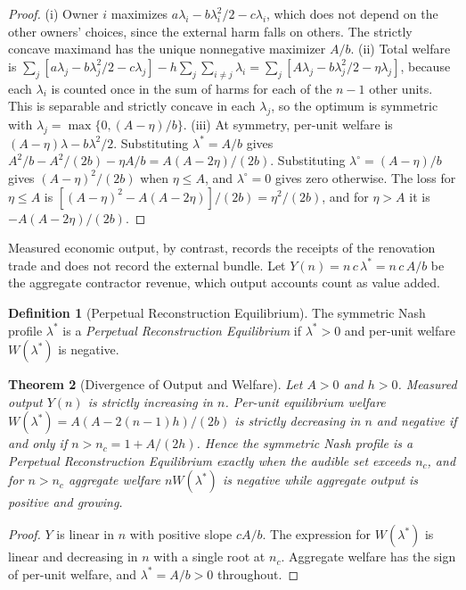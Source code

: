 \documentclass[11pt]{article}
\newtheorem{theorem}{Theorem}[section]
\theoremstyle{definition}
\newtheorem{definition}[theorem]{Definition}
\theoremstyle{remark}
\begin{document}
\begin{proof}
(i) Owner $i$ maximizes $a\lambda_i-b\lambda_i^2/2-c\lambda_i$, which does not depend on the other owners' choices, since the external harm falls on others. The strictly concave maximand has the unique nonnegative maximizer $A/b$. (ii) Total welfare is $\sum_j[a\lambda_j-b\lambda_j^2/2-c\lambda_j]-h\sum_j\sum_{i\ne j}\lambda_i=\sum_j[A\lambda_j-b\lambda_j^2/2-\eta\lambda_j]$, because each $\lambda_i$ is counted once in the sum of harms for each of the $n-1$ other units. This is separable and strictly concave in each $\lambda_j$, so the optimum is symmetric with $\lambda_j=\max\{0,(A-\eta)/b\}$. (iii) At symmetry, per-unit welfare is $(A-\eta)\lambda-b\lambda^2/2$. Substituting $\lambda^*=A/b$ gives $A^2/b - A^2/(2b)-\eta A/b = A(A-2\eta)/(2b)$. Substituting $\lambda^\circ=(A-\eta)/b$ gives $(A-\eta)^2/(2b)$ when $\eta\le A$, and $\lambda^\circ=0$ gives zero otherwise. The loss for $\eta\le A$ is $[(A-\eta)^2-A(A-2\eta)]/(2b)=\eta^2/(2b)$, and for $\eta>A$ it is $-A(A-2\eta)/(2b)$.
\end{proof}

Measured economic output, by contrast, records the receipts of the renovation trade and does not record the external bundle. Let $Y(n) = n\,c\,\lambda^* = n\,c\,A/b$ be the aggregate contractor revenue, which output accounts count as value added.

\begin{definition}[Perpetual Reconstruction Equilibrium]
The symmetric Nash profile $\lambda^*$ is a \emph{Perpetual Reconstruction Equilibrium} if $\lambda^*>0$ and per-unit welfare $W(\lambda^*)$ is negative.
\end{definition}

\begin{theorem}[Divergence of Output and Welfare]\label{thm:divergence}
Let $A>0$ and $h>0$. Measured output $Y(n)$ is strictly increasing in $n$. Per-unit equilibrium welfare $W(\lambda^*)=A(A-2(n-1)h)/(2b)$ is strictly decreasing in $n$ and negative if and only if $n>n_c = 1 + A/(2h)$. Hence the symmetric Nash profile is a Perpetual Reconstruction Equilibrium exactly when the audible set exceeds $n_c$, and for $n>n_c$ aggregate welfare $nW(\lambda^*)$ is negative while aggregate output is positive and growing.
\end{theorem}

\begin{proof}
$Y$ is linear in $n$ with positive slope $cA/b$. The expression for $W(\lambda^*)$ is linear and decreasing in $n$ with a single root at $n_c$. Aggregate welfare has the sign of per-unit welfare, and $\lambda^*=A/b>0$ throughout.
\end{proof}
\end{document}
